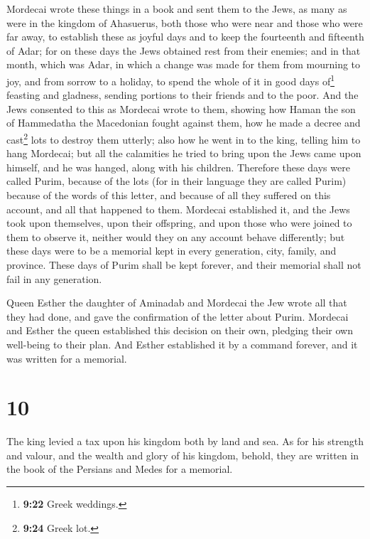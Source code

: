  Mordecai wrote these things in a book and sent them to
the Jews, as many as were in the kingdom of Ahasuerus, both those who
were near and those who were far away,  to establish
these as joyful days and to keep the fourteenth and fifteenth of Adar;
 for on these days the Jews obtained rest from their
enemies; and in that month, which was Adar, in which a change was made
for them from mourning to joy, and from sorrow to a holiday, to spend
the whole of it in good days of\footnote{\textbf{9:22} Greek weddings.}
feasting and gladness, sending portions to their friends and to the
poor.  And the Jews consented to this as Mordecai wrote
to them,  showing how Haman the son of Hammedatha the
Macedonian fought against them, how he made a decree and cast\footnote{\textbf{9:24}
  Greek lot.} lots to destroy them utterly;  also how he
went in to the king, telling him to hang Mordecai; but all the
calamities he tried to bring upon the Jews came upon himself, and he was
hanged, along with his children.  Therefore these days
were called Purim, because of the lots (for in their language they are
called Purim) because of the words of this letter, and because of all
they suffered on this account, and all that happened to them.
 Mordecai established it, and the Jews took upon
themselves, upon their offspring, and upon those who were joined to them
to observe it, neither would they on any account behave differently; but
these days were to be a memorial kept in every generation, city, family,
and province.  These days of Purim shall be kept forever,
and their memorial shall not fail in any generation.

 Queen Esther the daughter of Aminadab and Mordecai the
Jew wrote all that they had done, and gave the confirmation of the
letter about Purim.  Mordecai and Esther the queen
established this decision on their own, pledging their own well-being to
their plan.  And Esther established it by a command
forever, and it was written for a memorial.

\hypertarget{section-9}{%
\section{10}\label{section-9}}

 The king levied a tax upon his kingdom both by land and
sea.  As for his strength and valour, and the wealth and
glory of his kingdom, behold, they are written in the book of the
Persians and Medes for a memorial.

